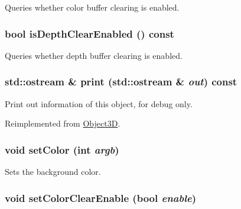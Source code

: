 Queries whether color buffer clearing is enabled. \hypertarget{classm3g_1_1Background_d20a03183cd1c6418dcadf94ac0ca470}{
\subsubsection[{isDepthClearEnabled}]{\setlength{\rightskip}{0pt plus 5cm}bool isDepthClearEnabled () const}}
\label{classm3g_1_1Background_d20a03183cd1c6418dcadf94ac0ca470}


Queries whether depth buffer clearing is enabled. \hypertarget{classm3g_1_1Background_6fea17fa1532df3794f8cb39cb4f911f}{
\subsubsection[{print}]{\setlength{\rightskip}{0pt plus 5cm}std::ostream \& print (std::ostream \& {\em out}) const}}
\label{classm3g_1_1Background_6fea17fa1532df3794f8cb39cb4f911f}


Print out information of this object, for debug only. 

Reimplemented from \hyperlink{classm3g_1_1Object3D_6fea17fa1532df3794f8cb39cb4f911f}{Object3D}.\hypertarget{classm3g_1_1Background_38439e862c59a31b90e57c18669061ae}{
\subsubsection[{setColor}]{\setlength{\rightskip}{0pt plus 5cm}void setColor (int {\em argb})}}
\label{classm3g_1_1Background_38439e862c59a31b90e57c18669061ae}


Sets the background color. \hypertarget{classm3g_1_1Background_68e4fe4cf32fe60f166056115081aa65}{
\subsubsection[{setColorClearEnable}]{\setlength{\rightskip}{0pt plus 5cm}void setColorClearEnable (bool {\em enable})}}
\label{classm3g_1_1Background_68e4fe4cf32fe60f166056115081aa65}


